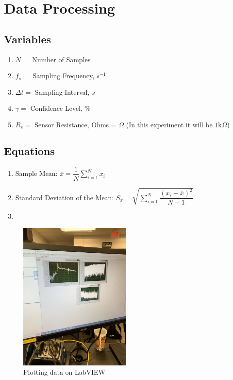 \documentclass{article}
\begin{document}
\section{Data Processing}
\subsection{Variables}
\begin{enumerate}[label = \roman*.]
    \item \(N = \) Number of Samples
    \item \(f_{s} = \) Sampling Frequency, $s^{-1}$
    \item \(\Delta t = \) Sampling Interval, $s$
    \item \(\gamma = \) Confidence Level, \%
    \item \(R_{s} = \) Sensor Resistance, Ohms = $\Omega$ (In this experiment it will be $1\text{k}\Omega$)
\end{enumerate}

\subsection{Equations}
\begin{enumerate}[label = \Roman*.]
    \item Sample Mean: \(\bar{x} = \dfrac{1}{N}\displaystyle\sum_{i=1}^{N} x_{i}\) 
    \item Standard Deviation of the Mean: \(S_{x} = \sqrt{\displaystyle\sum_{i=1}^{N} \dfrac{(x_{i} - \bar{x})^{2}}{N-1}}\)
    \item 
\end{enumerate}
 
\begin{figure}[H]
\centering
\includegraphics[width=0.5\textwidth, angle = -90]{Lab 2/lab2images/labview_plots.jpg}
\caption{Plotting data on LabVIEW}
\end{figure}
\end{document}

